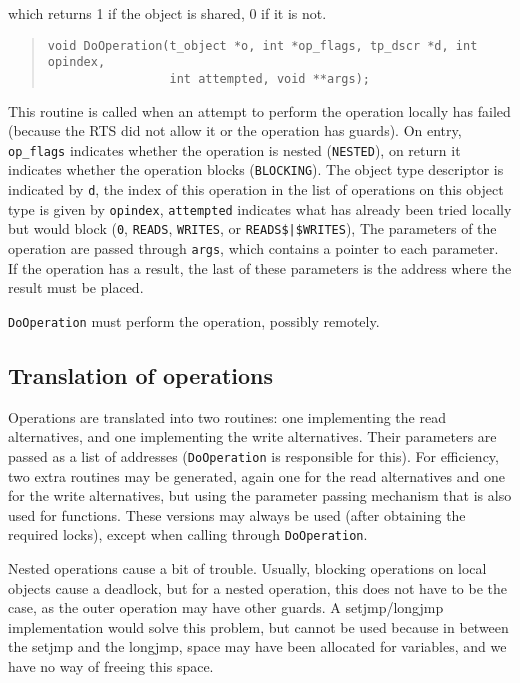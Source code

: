 \documentclass[10pt]{article}
\begin{document}
which returns 1 if the object is shared, 0 if it is not.
\begin{quote}
\begin{verbatim}
void DoOperation(t_object *o, int *op_flags, tp_dscr *d, int opindex,
                 int attempted, void **args);
\end{verbatim}
\end{quote}
This routine is called when an attempt to perform the operation locally has
failed (because the RTS did not allow it or the operation has guards).
On entry, \verb+op_flags+
indicates whether the operation is nested (\verb+NESTED+),
on return it indicates whether the operation blocks (\verb+BLOCKING+).
The object type descriptor is indicated by \verb+d+, the index of this
operation in the list of operations on this object type is given by
\verb+opindex+, \verb+attempted+ indicates what has already been tried
locally but would block (\verb+0+, \verb+READS+, \verb+WRITES+,
or \verb+READS$|$WRITES+),
The parameters of the operation are passed through \verb+args+, which
contains a pointer to each parameter.
If the operation has a result, the last of these parameters is the address
where the result must be placed.

\verb+DoOperation+
must perform the operation, possibly remotely.

\subsection{Translation of operations}
Operations are translated into two routines: one implementing the read
alternatives, and one implementing the write alternatives.
Their parameters are passed as a list of addresses (\verb+DoOperation+ is
responsible for this).
For efficiency, two extra routines may be generated, again one for the
read alternatives and one for the write alternatives, but using the
parameter passing mechanism that is also used for functions.
These versions may always be used (after obtaining the
required locks), except when calling through \verb+DoOperation+.

Nested operations cause a bit of trouble.
Usually, blocking operations on local objects cause a deadlock,
but for a nested operation, this does not have to be the case,
as the outer operation may have other guards.
A setjmp/longjmp implementation would solve this problem, but
cannot be used because in between the setjmp and the longjmp,
space may have been allocated for variables, and we have no way
of freeing this space.
\end{document}

